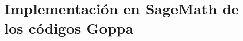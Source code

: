 \chapter[Implementación en SageMath de los códigos Goppa]{Implementación en SageMath de los códigos Goppa}
\label{annex:sage-Goppa}